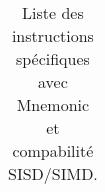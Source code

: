 \begin{table}[!tb]
\begin{tabular}{llccc}
          \bottomrule
      \end{tabular}   
      \caption{Liste des instructions spécifiques avec Mnemonic et compabilité SISD/SIMD.}
      \label{liste:all:instr}
  \end{table}